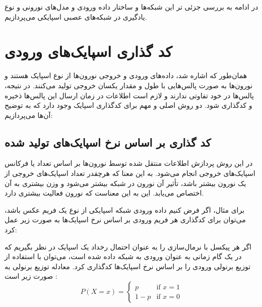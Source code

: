  در ادامه به بررسی جزئی تر این شبکه‌ها و ساختار داده ورودی و مدل‌های نورونی و نوع یادگیری در شبکه‌های عصبی اسپایکی می‌پردازیم.
 
\section{کد گذاری اسپایک‌های ورودی}

همان‌طور که اشاره شد، داده‌های ورودی و خروجی نورون‌ها از نوع اسپایک هستند و نورون‌ها به صورت پالس‌هایی با طول و مقدار یکسان خروجی تولید می‌کنند. در نتیجه، پالس‌ها در خود تفاوتی ندارند و لازم است اطلاعات در زمان ارسال این پالس‌ها ذخیره و کدگذاری شود. دو روش اصلی و مهم برای کدگذاری اسپایک وجود دارد که به توضیح آن‌ها می‌پردازیم:



\subsection{کد گذاری بر اساس نرخ اسپایک‌های تولید شده}
در این روش پردازش اطلاعات منتقل شده توسط نورون‌ها بر اساس تعداد یا فرکانس اسپایک‌های خروجی انجام می‌شود. به این معنا که هرچقدر تعداد اسپایک‌های خروجی از یک نورون بیشتر باشد، تأثیر آن نورون در شبکه بیشتر می‌شود و وزن بیشتری به آن اختصاص می‌یابد. این به این معناست که نورون فعالیت بیشتری دارد.

برای مثال، اگر فرض کنیم داده ورودی شبکه اسپایکی از نوع یک فریم عکس باشد، می‌توان برای کدگذاری هر فریم ورودی بر اساس نرخ اسپایک‌ها به صورت زیر عمل کرد:

اگر هر پیکسل با نرمال‌سازی را به عنوان احتمال رخداد یک اسپایک در نظر بگیریم که در یک گام زمانی به عنوان ورودی به شبکه داده شده است، می‌توان با استفاده از توزیع برنولی ورودی را بر اساس نرخ اسپایک‌ها کدگذاری کرد. معادله توزیع برنولی به صورت زیر است :
\begin{equation}
	P(X = x) = \begin{cases}
		p & \text{if } x = 1 \\
		1 - p & \text{if } x = 0
	\end{cases}
\end{equation}






